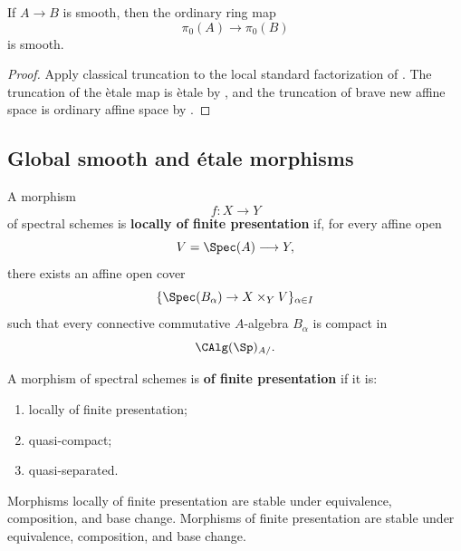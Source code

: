\begin{corollary}
\label{cor:classical-truncation-smooth}
If $A\to B$ is smooth, then the ordinary ring map
\[
    \pi_0(A)
    \longrightarrow
    \pi_0(B)
\]
is smooth.
\end{corollary}

\begin{proof}
Apply classical truncation to the local standard factorization of
. The truncation of the \`etale map is
\`etale by , and the truncation of brave
new affine space is ordinary affine space by
.
\end{proof}

\subsection{Global smooth and \texorpdfstring{\'{e}tale}{etale} morphisms}

\begin{definition}
\label{def:locally-finitely-presented-spectral-morphism}
A morphism
\[
    f
    \colon
    X
    \longrightarrow
    Y
\]
of spectral schemes is \textbf{locally of finite presentation} if, for
every affine open
\[
    V=\Spec(A)
    \longrightarrow
    Y,
\]
there exists an affine open cover
\[
    \{\Spec(B_\alpha)\to X\times_YV\}_{\alpha\in I}
\]
such that every connective commutative $A$-algebra $B_\alpha$ is compact
in
\[
    \CAlg(\Sp)_{A/}.
\]
\end{definition}

\begin{definition}
\label{def:finitely-presented-spectral-morphism}
A morphism of spectral schemes is \textbf{of finite presentation} if it
is:
\begin{enumerate}[label=(\roman*)]
    \item locally of finite presentation;

    \item quasi-compact;

    \item quasi-separated.
\end{enumerate}
\end{definition}

\begin{proposition}
\label{prop:global-finite-presentation-permanence}
Morphisms locally of finite presentation are stable under equivalence,
composition, and base change. Morphisms of finite presentation are stable
under equivalence, composition, and base change.
\end{proposition}

